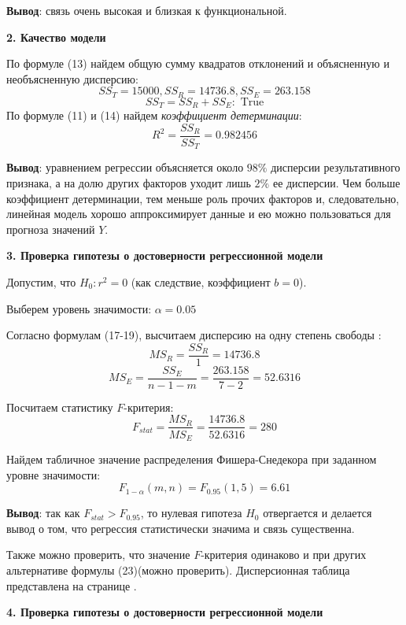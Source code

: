 \documentclass[aps,%
12pt,%
final,%
oneside,
onecolumn,%
musixtex, %
superscriptaddress,%
centertags]{article} %
\begin{document}
\textbf{Вывод}: связь очень высокая и близкая к функциональной.

\begin{center}
\textbf{2. Качество модели} 
\end{center}

По формуле (13) найдем общую сумму квадратов отклонений и объясненную и необъясненную дисперсию:
$$ SS_T = 15000 , SS_R = 14736.8, SS_E = 263.158$$
$$ SS_T = SS_R + SS_E:  \text{ True}$$ 
По формуле (11) и (14) найдем \textit{коэффициент детерминации}:
$$ R^2 = \frac{SS_R}{SS_T} = 0.982456$$ 

\textbf{Вывод}: уравнением регрессии объясняется около $98\%$ дисперсии результативного признака, а на долю других факторов уходит лишь $2\%$ ее дисперсии. Чем больше коэффициент детерминации, тем меньше роль прочих факторов и, следовательно, линейная модель хорошо аппроксимирует данные и ею можно пользоваться для прогноза значений $Y$.

\begin{center}
\textbf{3. Проверка гипотезы о достоверности регрессионной модели} 
\end{center}

Допустим, что $H_0: r^2 = 0$ (как следствие, коэффициент $b=0$).

Выберем уровень значимости: $\alpha = 0.05$

Согласно формулам (17-19), высчитаем дисперсию на одну степень свободы :
$$ MS_R = \frac{SS_R}{1} = 14736.8 $$
$$ MS_E = \frac{SS_E}{n-1-m} = \frac{263.158}{7-2} = 52.6316 $$

Посчитаем статистику $F$-критерия: $$ F_{stat} = \frac{MS_R}{MS_E} = \frac{14736.8}{52.6316} = 280$$

Найдем табличное значение распределения Фишера-Снедекора при заданном уровне значимости:
$$ F_{1-\alpha}(m,n) = F_{0.95}(1,5) = 6.61$$

\textbf{Вывод}: так как $F_{stat}  > F_{0.95} $, то нулевая гипотеза $H_0$ отвергается и делается вывод о том, что регрессия статистически значима и связь существенна.

Также можно проверить, что значение $F$-критерия одинаково и при других альтернативе формулы (23)(можно проверить). Дисперсионная таблица представлена на странице \pageref{first_table_analiz}.

\begin{center}
\textbf{4. Проверка гипотезы о достоверности регрессионной модели} 
\end{center}
\end{document}
